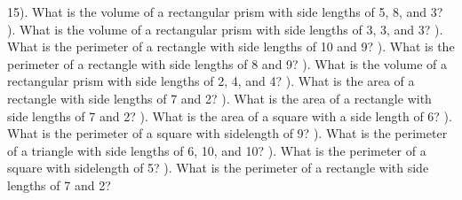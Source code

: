\documentclass{article}%
\begin{document}
15). What is the volume of a rectangular prism with side lengths of 5, 8, and 3?%
\newline%
\newline%
). What is the volume of a rectangular prism with side lengths of 3, 3, and 3?%
\newline%
\newline%
). What is the perimeter of a rectangle with side lengths of 10 and 9?%
\newline%
\newline%
). What is the perimeter of a rectangle with side lengths of 8 and 9?%
\newline%
\newline%
). What is the volume of a rectangular prism with side lengths of 2, 4, and 4?%
\newline%
\newline%
). What is the area of a rectangle with side lengths of 7 and 2?%
\newline%
\newline%
). What is the area of a rectangle with side lengths of 7 and 2?%
\newline%
\newline%
). What is the area of a square with a side length of 6?%
\newline%
\newline%
). What is the perimeter of a square with sidelength of 9?%
\newline%
\newline%
). What is the perimeter of a triangle with side lengths of 6, 10, and 10?%
\newline%
\newline%
). What is the perimeter of a square with sidelength of 5?%
\newline%
\newline%
). What is the perimeter of a rectangle with side lengths of 7 and 2?%
\newline%
\newline%
\end{document}
